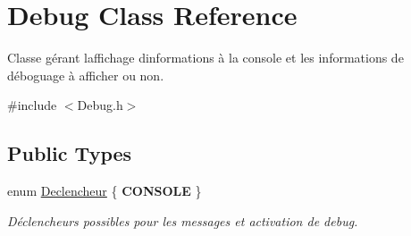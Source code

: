 \hypertarget{class_debug}{}\section{Debug Class Reference}
\label{class_debug}


Classe gérant l\textquotesingle{}affichage d\textquotesingle{}informations à la console et les informations de déboguage à afficher ou non.  




{\ttfamily \#include $<$Debug.\+h$>$}

\subsection*{Public Types}
\begin{DoxyCompactItemize}
\item 
\hypertarget{class_debug_afd6ed3c50c08d0a7830cd5253b4ab8b6}{}enum \hyperlink{class_debug_afd6ed3c50c08d0a7830cd5253b4ab8b6}{Declencheur} \{ {\bfseries C\+O\+N\+S\+O\+L\+E}
 \}\label{class_debug_afd6ed3c50c08d0a7830cd5253b4ab8b6}
\begin{DoxyCompactList}\small\item\em Déclencheurs possibles pour les messages et activation de debug. \end{DoxyCompactList}
\end{DoxyCompactItemize}
